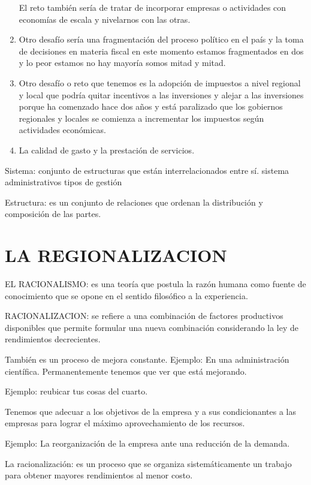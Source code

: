 \documentclass[
  a4paper,
]{article}
\begin{document}
\begin{enumerate}
  El reto también sería de tratar de incorporar empresas o actividades
  con economías de escala y nivelarnos con las otras.
\item
  Otro desafío sería una fragmentación del proceso político en el país y
  la toma de decisiones en materia fiscal en este momento estamos
  fragmentados en dos y lo peor estamos no hay mayoría somos mitad y
  mitad.
\item
  Otro desafío o reto que tenemos es la adopción de impuestos a nivel
  regional y local que podría quitar incentivos a las inversiones y
  alejar a las inversiones porque ha comenzado hace dos años y está
  paralizado que los gobiernos regionales y locales se comienza a
  incrementar los impuestos según actividades económicas.
\item
  La calidad de gasto y la prestación de servicios.
\end{enumerate}

Sistema: conjunto de estructuras que están interrelacionados entre sí.
sistema administrativos tipos de gestión

Estructura: es un conjunto de relaciones que ordenan la distribución y
composición de las partes.

\hypertarget{la-regionalizacion}{%
\section{LA REGIONALIZACION}\label{la-regionalizacion}}

EL RACIONALISMO: es una teoría que postula la razón humana como fuente
de conocimiento que se opone en el sentido filosófico a la experiencia.

RACIONALIZACION: se refiere a una combinación de factores productivos
disponibles que permite formular una nueva combinación considerando la
ley de rendimientos decrecientes.

También es un proceso de mejora constante. Ejemplo: En una
administración científica. Permanentemente tenemos que ver que está
mejorando.

Ejemplo: reubicar tus cosas del cuarto.

Tenemos que adecuar a los objetivos de la empresa y a sus condicionantes
a las empresas para lograr el máximo aprovechamiento de los recursos.

Ejemplo: La reorganización de la empresa ante una reducción de la
demanda.

La racionalización: es un proceso que se organiza sistemáticamente un
trabajo para obtener mayores rendimientos al menor costo.
\end{document}
